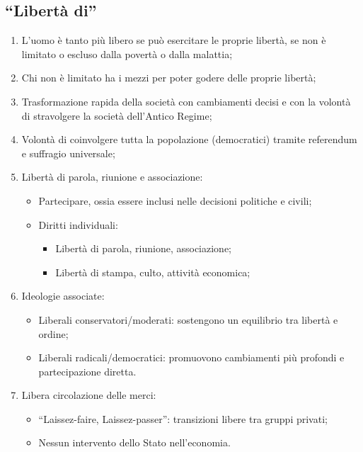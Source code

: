 \documentclass{article}
\begin{document}
\subsection{``Libertà di''}
\begin{enumerate}
    \item L'uomo è tanto più libero se può esercitare le proprie libertà, se non è limitato o
        escluso dalla povertà o dalla malattia;
    \item Chi non è limitato ha i mezzi per poter godere delle proprie libertà;
    \item Trasformazione rapida della società con cambiamenti decisi e con la volontà di
        stravolgere la società dell'Antico Regime;
    \item Volontà di coinvolgere tutta la popolazione (democratici) tramite referendum e
        suffragio universale; 
    \item Libertà di parola, riunione e associazione:
        \begin{itemize}
            \item Partecipare, ossia essere inclusi nelle decisioni politiche e civili;
            \item Diritti individuali:
                \begin{itemize}
                    \item Libertà di parola, riunione, associazione;
                    \item Libertà di stampa, culto, attività economica;
                \end{itemize}
        \end{itemize}
    \item Ideologie associate:
        \begin{itemize}
            \item Liberali conservatori/moderati: sostengono un equilibrio tra libertà e ordine;
            \item Liberali radicali/democratici: promuovono cambiamenti più profondi e
                partecipazione diretta.
        \end{itemize}
    \item Libera circolazione delle merci:
        \begin{itemize}
            \item ``Laissez-faire, Laissez-passer'': transizioni libere tra gruppi privati;
            \item Nessun intervento dello Stato nell'economia.
        \end{itemize}
\end{enumerate}
\end{document}

